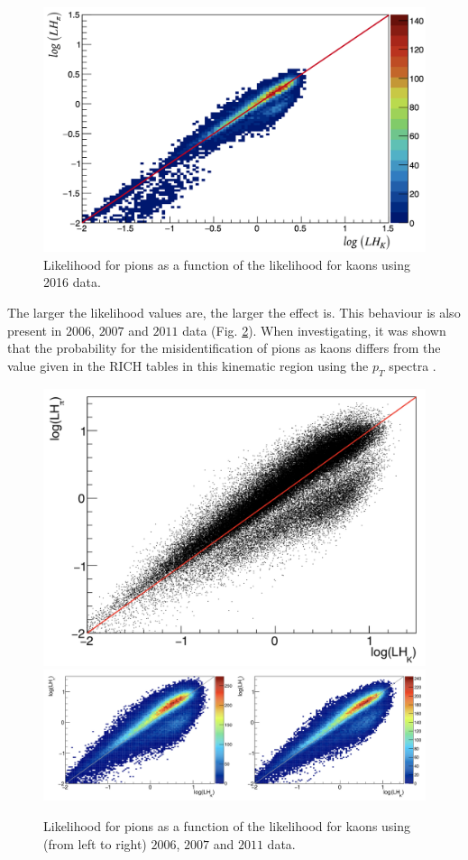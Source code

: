 \begin{figure}[!h]
  \centering
	\includegraphics[scale=0.35]{./gfx/RICHLH.png}
	\caption{Likelihood for pions as a function of the likelihood for kaons using 2016 data.}
	\label{pic:NonLin}
\end{figure}

The larger the likelihood values are, the larger the effect is. This behaviour is also present in $2006$, $2007$ and $2011$ data (Fig. \ref{pic:NonLinother}). When investigating, it was shown that the probability for the misidentification of pions as kaons differs from the value given in the RICH tables in this kinematic region using the $p_T$ spectra \cite{MarcinNote}.

\begin{figure}[!h]
  \centering
	\includegraphics[scale=0.2]{./gfx/RICHLH2006.png}
  \includegraphics[scale=0.3]{./gfx/RICHLH2011.png}
	\caption{Likelihood for pions as a function of the likelihood for kaons using (from left to right) $2006$, $2007$ and $2011$ data.}
	\label{pic:NonLinother}
\end{figure}

